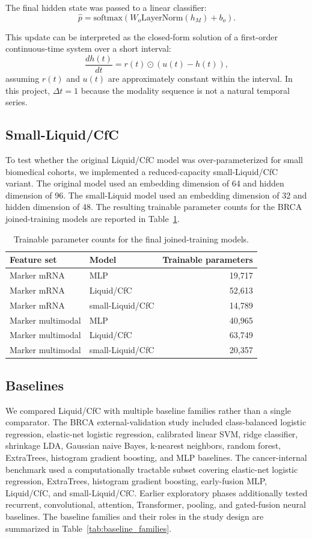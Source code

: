 The final hidden state was passed to a linear classifier:
\[
\hat{p} = \mathrm{softmax}(W_o \mathrm{LayerNorm}(h_M)+b_o).
\]

This update can be interpreted as the closed-form solution of a first-order continuous-time system over a short interval:
\[
\frac{dh(t)}{dt} = r(t)\odot \left(u(t)-h(t)\right),
\]
assuming \(r(t)\) and \(u(t)\) are approximately constant within the interval. In this project, \(\Delta t=1\) because the modality sequence is not a natural temporal series.

\subsection{Small-Liquid/CfC}

To test whether the original Liquid/CfC model was over-parameterized for small biomedical cohorts, we implemented a reduced-capacity small-Liquid/CfC variant. The original model used an embedding dimension of 64 and hidden dimension of 96. The small-Liquid model used an embedding dimension of 32 and hidden dimension of 48.
The resulting trainable parameter counts for the BRCA joined-training models are reported in Table~\ref{tab:params}.

\begin{table}[ht]
\centering
\caption{Trainable parameter counts for the final joined-training models.}
\begin{tabular}{llr}
\toprule
Feature set & Model & Trainable parameters \\
\midrule
Marker mRNA & MLP & 19,717 \\
Marker mRNA & Liquid/CfC & 52,613 \\
Marker mRNA & small-Liquid/CfC & 14,789 \\
Marker multimodal & MLP & 40,965 \\
Marker multimodal & Liquid/CfC & 63,749 \\
Marker multimodal & small-Liquid/CfC & 20,357 \\
\bottomrule
\end{tabular}
\label{tab:params}
\end{table}

\subsection{Baselines}

We compared Liquid/CfC with multiple baseline families rather than a single comparator. The BRCA external-validation study included class-balanced logistic regression, elastic-net logistic regression, calibrated linear SVM, ridge classifier, shrinkage LDA, Gaussian naive Bayes, k-nearest neighbors, random forest, ExtraTrees, histogram gradient boosting, and MLP baselines. The cancer-internal benchmark used a computationally tractable subset covering elastic-net logistic regression, ExtraTrees, histogram gradient boosting, early-fusion MLP, Liquid/CfC, and small-Liquid/CfC. Earlier exploratory phases additionally tested recurrent, convolutional, attention, Transformer, pooling, and gated-fusion neural baselines.
The baseline families and their roles in the study design are summarized in Table~\ref{tab:baseline_families}.

